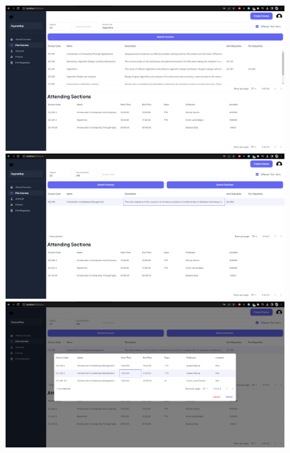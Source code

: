 \documentclass[12pt, a4paper]{article}
\begin{document}
\begin{center}
    \includegraphics[width=400px]{R11/i1}
    \includegraphics[width=400px]{R11/i2}
    \includegraphics[width=400px]{R11/i3}
\end{center}
\end{document}
